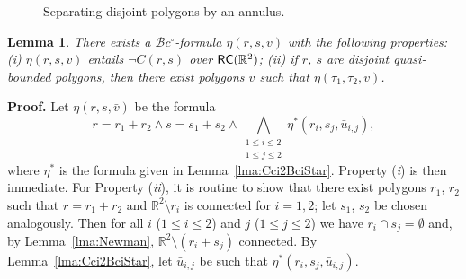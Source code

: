 \documentclass{article}
\newtheorem{lemma}[theorem]{Lemma}
\newcommand{\cBci}{\ensuremath{\mathcal{B}c^\circ}}
\newcommand{\R}{\mathbb{R}}
\newcommand{\RC}{{\sf RC}}
\newcommand{\qedsymbol}{\ding{113}}
\newenvironment{proof}{\par\noindent\textbf{Proof.}}{\mbox{}\hfill\qedsymbol\par\bigskip}
\begin{document}
\begin{figure}[h]
\begin{center}
\end{center}
\caption{Separating disjoint polygons by an annulus.}	\label{fig:Cci2BciStar}
\end{figure}
\begin{lemma}\label{lma:Cci2Bci}
	There exists a $\cBci$-formula $\eta(r,s, \bar{v})$ with the following
	properties: \textup{(}i\textup{)} $\eta(r,s, \bar{v})$ entails $\neg
	C(r,s)$ over $\RC(\R^2)$; \textup{(}ii\textup{)} if $r$, $s$ are
	disjoint quasi-bounded polygons, then there exist
	polygons $\bar{v}$ such that $\eta(\tau_1, \tau_2, \bar{v})$.
\end{lemma}
\begin{proof}
Let $\eta(r,s, \bar{v})$ be the formula
	\begin{equation*}
	r = r_1 + r_2 \wedge s = s_1 + s_2 \wedge \bigwedge_{\substack{1 \leq i \leq 2\\
	  1 \leq j \leq 2}} \eta^*(r_i, s_j, \bar{u}_{i,j}),
	\end{equation*}
	where $\eta^*$ is the formula given in
	Lemma~\ref{lma:Cci2BciStar}. Property ({\em i}) is then immediate. For
	Property ({\em ii}), it is routine to show that there exist  polygons $r_1$, $r_2$
	such that $r = r_1 + r_2$ and $\R^2 \setminus r_i$ is connected for $i
	= 1,2$; let $s_1$, $s_2$ be chosen analogously. Then for all $i$ ($1 \leq i
	\leq 2$) and $j$ ($1 \leq j \leq 2$) we have $r_i \cap s_j =
	\emptyset$ and, by Lemma~\ref{lma:Newman}, $\R^2 \setminus (r_i +
	s_j)$ connected. By Lemma~\ref{lma:Cci2BciStar}, let
	$\bar{u}_{i,j}$ be such that $\eta^*(r_i, s_j, \bar{u}_{i,j})$.
\end{proof}
\end{document}
